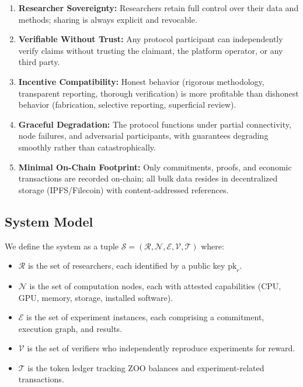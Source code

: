 \documentclass[11pt,a4paper]{article}
\begin{document}
\begin{enumerate}[leftmargin=*]
    \item \textbf{Researcher Sovereignty:} Researchers retain full control over their data and methods; sharing is always explicit and revocable.
    \item \textbf{Verifiable Without Trust:} Any protocol participant can independently verify claims without trusting the claimant, the platform operator, or any third party.
    \item \textbf{Incentive Compatibility:} Honest behavior (rigorous methodology, transparent reporting, thorough verification) is more profitable than dishonest behavior (fabrication, selective reporting, superficial review).
    \item \textbf{Graceful Degradation:} The protocol functions under partial connectivity, node failures, and adversarial participants, with guarantees degrading smoothly rather than catastrophically.
    \item \textbf{Minimal On-Chain Footprint:} Only commitments, proofs, and economic transactions are recorded on-chain; all bulk data resides in decentralized storage (IPFS/Filecoin) with content-addressed references.
\end{enumerate}

\subsection{System Model}

We define the system as a tuple $\mathcal{S} = (\mathcal{R}, \mathcal{N}, \mathcal{E}, \mathcal{V}, \mathcal{T})$ where:

\begin{itemize}[leftmargin=*]
    \item $\mathcal{R}$ is the set of researchers, each identified by a public key $\text{pk}_r$.
    \item $\mathcal{N}$ is the set of computation nodes, each with attested capabilities (CPU, GPU, memory, storage, installed software).
    \item $\mathcal{E}$ is the set of experiment instances, each comprising a commitment, execution graph, and results.
    \item $\mathcal{V}$ is the set of verifiers who independently reproduce experiments for reward.
    \item $\mathcal{T}$ is the token ledger tracking ZOO balances and experiment-related transactions.
\end{itemize}
\end{document}
